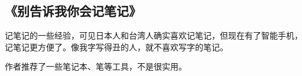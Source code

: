 \subsection{《别告诉我你会记笔记》}
记笔记的一些经验，可见日本人和台湾人确实喜欢记笔记，但现在有了智能手机，记笔记更方便了。像我字写得丑的人，就不喜欢写字的笔记。

作者推荐了一些笔记本、笔等工具，不是很实用。